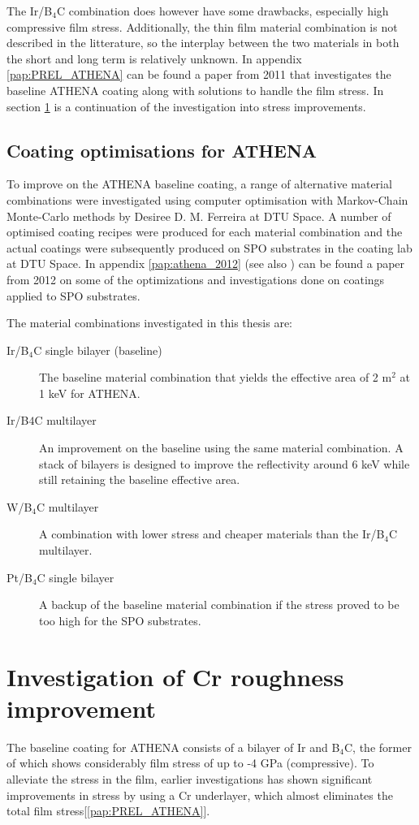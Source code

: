 The Ir/B$_4$C combination does however have some drawbacks, especially high compressive film stress. Additionally, the thin film material combination is not described in the litterature, so the interplay between the two materials in both the short and long term is relatively unknown. In appendix \ref{pap:PREL_ATHENA} can be found a paper from 2011 that investigates the baseline ATHENA coating along with solutions to handle the film stress. In section \ref{sec:athena_cr_impro} is a continuation of the investigation into stress improvements.

\subsection{Coating optimisations for ATHENA}
To improve on the ATHENA baseline coating, a range of alternative material combinations were investigated using computer optimisation with Markov-Chain Monte-Carlo methods by Desiree D. M. Ferreira at DTU Space. A number of optimised coating recipes were produced for each material combination and the actual coatings were subsequently produced on SPO substrates in the coating lab at DTU Space. In appendix \ref{pap:athena_2012} (see also \cite{ferreira2012athena}) can be found a paper from 2012 on some of the optimizations and investigations done on coatings applied to SPO substrates.

The material combinations investigated in this thesis are:

\begin{description}
  \item[Ir/B$_4$C single bilayer (baseline)] The baseline material combination that yields the effective area of 2 m$^2$ at 1 keV for ATHENA.
  \item[Ir/B$4$C multilayer] An improvement on the baseline using the same material combination. A stack of bilayers is designed to improve the reflectivity around 6 keV while still retaining the baseline effective area.
  \item[W/B$_4$C multilayer] A combination with lower stress and cheaper materials than the Ir/B$_4$C multilayer.
  \item[Pt/B$_4$C single bilayer] A backup of the baseline material combination if the stress proved to be too high for the SPO substrates.
\end{description}

\section{Investigation of Cr roughness improvement}\label{sec:athena_cr_impro}
The baseline coating for ATHENA consists of a bilayer of Ir and B$_4$C, the former of which shows considerably film stress of up to -4 GPa (compressive). To alleviate the stress in the film, earlier investigations has shown significant improvements in stress by using a Cr underlayer, which almost eliminates the total film stress[\ref{pap:PREL_ATHENA}].

